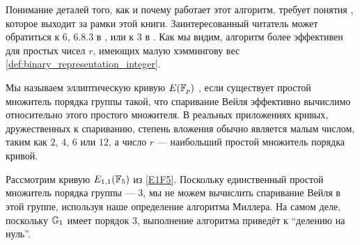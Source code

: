 Понимание деталей того, как и почему работает этот алгоритм, требует понятия , которое выходит за рамки этой книги. Заинтересованный читатель может обратиться к \chaptname{} 6, \secname{} 6.8.3 в \cite{hoffstein-2008}, или к \chaptname {} 3 в \cite{costello-pairings}. Как мы видим, алгоритм более эффективен для простых чисел $r$, имеющих малую хэммингову вес \ref{def:binary_representation_integer}.

Мы называем эллиптическую кривую $E(\mathbb{F}_p)$ , если существует простой множитель порядка группы такой, что спаривание Вейля эффективно вычислимо относительно этого простого множителя. В реальных приложениях кривых, дружественных к спариванию, степень вложения обычно является малым числом, таким как $2$, $4$, $6$ или $12$, а число $r$ — наибольший простой множитель порядка кривой. 

\begin{example}Рассмотрим кривую $E_{1,1}(\mathbb{F}_5)$ из \examplename{} \ref{E1F5}. Поскольку единственный простой множитель порядка группы — $3$, мы не можем вычислить спаривание Вейля в этой группе, используя наше определение алгоритма Миллера. На самом деле, поскольку $\mathbb{G}_1$ имеет порядок $3$, выполнение алгоритма приведёт к ``делению на нуль''.
\end{example}

